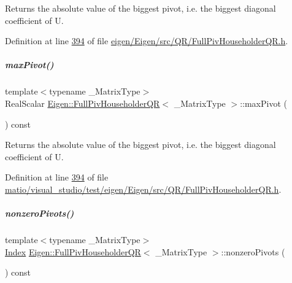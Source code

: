 \begin{DoxyReturn}{Returns}
the absolute value of the biggest pivot, i.\+e. the biggest diagonal coefficient of U. 
\end{DoxyReturn}


Definition at line \hyperlink{eigen_2_eigen_2src_2_q_r_2_full_piv_householder_q_r_8h_source_l00394}{394} of file \hyperlink{eigen_2_eigen_2src_2_q_r_2_full_piv_householder_q_r_8h_source}{eigen/\+Eigen/src/\+Q\+R/\+Full\+Piv\+Householder\+Q\+R.\+h}.

\mbox{\label{group___q_r___module_a7887506237a3bf912aebc9aaa8edacec}} 
\subparagraph{\texorpdfstring{max\+Pivot()}{maxPivot()}\hspace{0.1cm}{\footnotesize\ttfamily [2/2]}}
{\footnotesize\ttfamily template$<$typename \+\_\+\+Matrix\+Type$>$ \\
Real\+Scalar \hyperlink{group___q_r___module_class_eigen_1_1_full_piv_householder_q_r}{Eigen\+::\+Full\+Piv\+Householder\+QR}$<$ \+\_\+\+Matrix\+Type $>$\+::max\+Pivot (\begin{DoxyParamCaption}{ }\end{DoxyParamCaption}) const\hspace{0.3cm}{\ttfamily [inline]}}

\begin{DoxyReturn}{Returns}
the absolute value of the biggest pivot, i.\+e. the biggest diagonal coefficient of U. 
\end{DoxyReturn}


Definition at line \hyperlink{matio_2visual__studio_2test_2eigen_2_eigen_2src_2_q_r_2_full_piv_householder_q_r_8h_source_l00394}{394} of file \hyperlink{matio_2visual__studio_2test_2eigen_2_eigen_2src_2_q_r_2_full_piv_householder_q_r_8h_source}{matio/visual\+\_\+studio/test/eigen/\+Eigen/src/\+Q\+R/\+Full\+Piv\+Householder\+Q\+R.\+h}.

\mbox{\label{group___q_r___module_af1e4d04824084a964c1a6e51db68376f}} 
\subparagraph{\texorpdfstring{nonzero\+Pivots()}{nonzeroPivots()}\hspace{0.1cm}{\footnotesize\ttfamily [1/2]}}
{\footnotesize\ttfamily template$<$typename \+\_\+\+Matrix\+Type$>$ \\
\hyperlink{namespace_eigen_a62e77e0933482dafde8fe197d9a2cfde}{Index} \hyperlink{group___q_r___module_class_eigen_1_1_full_piv_householder_q_r}{Eigen\+::\+Full\+Piv\+Householder\+QR}$<$ \+\_\+\+Matrix\+Type $>$\+::nonzero\+Pivots (\begin{DoxyParamCaption}{ }\end{DoxyParamCaption}) const\hspace{0.3cm}{\ttfamily [inline]}}

